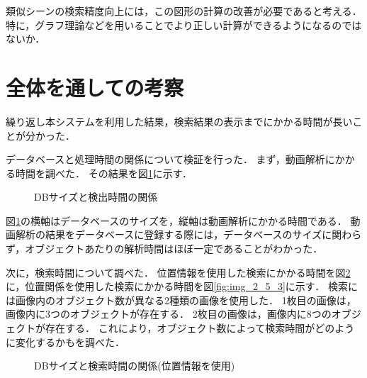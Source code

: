 \documentclass[a4j,12pt,dvipdfmx]{jreport}
\begin{document}
類似シーンの検索精度向上には，この図形の計算の改善が必要であると考える．
特に，グラフ理論などを用いることでより正しい計算ができるようになるのではないか．

\section{全体を通しての考察}\label{chap4-4}

繰り返し本システムを利用した結果，検索結果の表示までにかかる時間が長いことが分かった．

データベースと処理時間の関係について検証を行った．
まず，動画解析にかかる時間を調べた．
その結果を図\ref{fig:img_2_5}に示す．
\begin{figure}[t]
  \centering
  \caption{DBサイズと検出時間の関係}
  \label{fig:img_2_5}
\end{figure}

図\ref{fig:img_2_5}の横軸はデータベースのサイズを，縦軸は動画解析にかかる時間である．
動画解析の結果をデータベースに登録する際には，データベースのサイズに関わらず，オブジェクトあたりの解析時間はほぼ一定であることがわかった．

次に，検索時間について調べた．
位置情報を使用した検索にかかる時間を図\ref{fig:img_2_5_2}に，位置関係を使用した検索にかかる時間を図\ref{fig:img_2_5_3}に示す．
検索には画像内のオブジェクト数が異なる2種類の画像を使用した．
1枚目の画像は，画像内に3つのオブジェクトが存在する．
2枚目の画像は，画像内に8つのオブジェクトが存在する．
これにより，オブジェクト数によって検索時間がどのように変化するかもを調べた．
\begin{figure}[t]
  \centering
  \caption{DBサイズと検索時間の関係(位置情報を使用)}
  \label{fig:img_2_5_2}
\end{figure}
\end{document}
